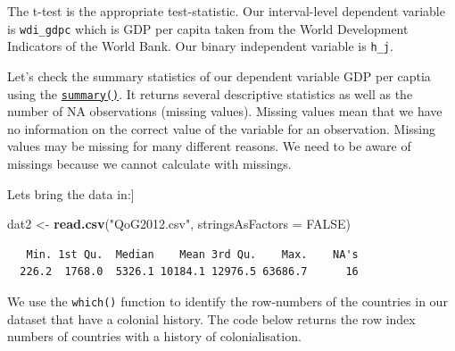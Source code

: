 \documentclass[]{article}
\newenvironment{Shaded}{\begin{snugshade}}{\end{snugshade}}
\newcommand{\DataTypeTok}[1]{\textcolor[rgb]{0.13,0.29,0.53}{#1}}
\newcommand{\DecValTok}[1]{\textcolor[rgb]{0.00,0.00,0.81}{#1}}
\newcommand{\KeywordTok}[1]{\textcolor[rgb]{0.13,0.29,0.53}{\textbf{#1}}}
\newcommand{\NormalTok}[1]{#1}
\newcommand{\OperatorTok}[1]{\textcolor[rgb]{0.81,0.36,0.00}{\textbf{#1}}}
\newcommand{\OtherTok}[1]{\textcolor[rgb]{0.56,0.35,0.01}{#1}}
\newcommand{\StringTok}[1]{\textcolor[rgb]{0.31,0.60,0.02}{#1}}
\begin{document}
The t-test is the appropriate test-statistic. Our interval-level dependent variable is \texttt{wdi\_gdpc} which is GDP per capita taken from the World Development Indicators of the World Bank. Our binary independent variable is \texttt{h\_j}.

Let's check the summary statistics of our dependent variable GDP per captia using the \href{https://www.rdocumentation.org/packages/base/versions/3.4.1/topics/summary}{\texttt{summary()}}. It returns several descriptive statistics as well as the number of NA observations (missing values). Missing values mean that we have no information on the correct value of the variable for an observation. Missing values may be missing for many different reasons. We need to be aware of missings because we cannot calculate with missings.

Lets bring the data in:{]}

\begin{Shaded}
\begin{Highlighting}[]
\NormalTok{dat2 <-}\StringTok{ }\KeywordTok{read.csv}\NormalTok{(}\StringTok{"QoG2012.csv"}\NormalTok{, }\DataTypeTok{stringsAsFactors =} \OtherTok{FALSE}\NormalTok{)}
\end{Highlighting}
\end{Shaded}

\begin{Shaded}
\end{Shaded}

\begin{verbatim}
   Min. 1st Qu.  Median    Mean 3rd Qu.    Max.    NA's 
  226.2  1768.0  5326.1 10184.1 12976.5 63686.7      16 
\end{verbatim}

We use the \texttt{which()} function to identify the row-numbers of the countries in our dataset that have a colonial history. The code below returns the row index numbers of countries with a history of colonialisation.

\begin{Shaded}
\end{Shaded}
\end{document}
